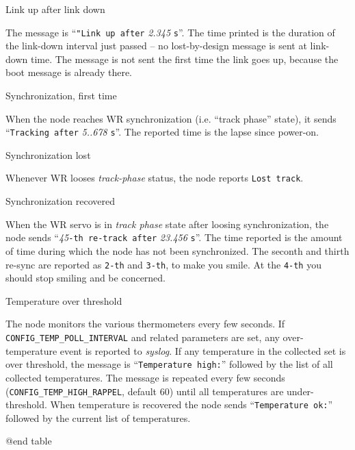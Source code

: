 \documentclass[a4paper, 12pt]{article}
\begin{document}
\item Link up after link down

	The message is ``\texttt{"Link up after} \textit{2.345} \texttt{s}''. The
        time printed is the duration of the link-down interval just
        passed -- no lost-by-design message is sent at link-down time. The
        message is not sent the first time the link goes up, because
        the boot message is already there.

\item Synchronization, first time

	When the node reaches WR synchronization (i.e. ``track phase''
        state), it sends ``\texttt{Tracking after} \textit{5..678} \texttt{s}''.
        The reported time is the lapse since power-on.

\item Synchronization lost

	Whenever WR looses \textit{track-phase} status, the node reports
        \texttt{Lost track}.

\item Synchronization recovered

	When the WR servo is in \textit{track phase} state after loosing
        synchronization, the node sends ``\textit{45}\texttt{-th re-track after}
        \textit{23.456} \texttt{s}''. The time reported is the amount of time
        during which the node has not been synchronized. The seconth and
        thirth re-sync are reported as \texttt{2-th} and \texttt{3-th}, to make you
        smile. At the \texttt{4-th} you should stop smiling and be concerned.

\item Temperature over threshold

	The node monitors the various thermometers every few seconds.
        If \texttt{CONFIG\_TEMP\_POLL\_INTERVAL} and related parameters are
        set, any over-temperature event is reported to \textit{syslog}.
        If any temperature in the collected set is over threshold,
        the message is ``\texttt{Temperature high:}'' followed by the list of
        all collected temperatures.  The message is repeated every
        few seconds (\texttt{CONFIG\_TEMP\_HIGH\_RAPPEL}, default 60)
        until all temperatures are under-threshold. When temperature
        is recovered the node sends ``\texttt{Temperature ok:}'' followed by
        the current list of temperatures.

@end table

\end{document}
